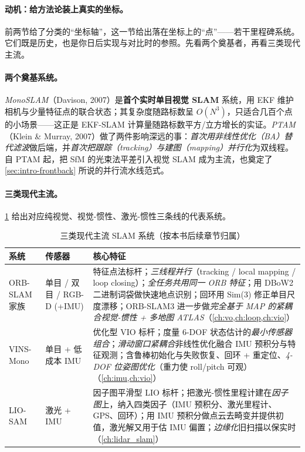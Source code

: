 \paragraph{动机：给方法论装上真实的坐标。}
前两节给了分类的“坐标轴”，这一节给出落在坐标上的“点”——若干里程碑系统。它们既是历史，也是你日后实现与对比时的参照。先看两个奠基者，再看三类现代主流。

\paragraph{两个奠基系统。}
\emph{MonoSLAM}（Davison, 2007）是\textbf{首个实时单目视觉 SLAM} 系统，用 EKF 维护相机与少量特征点的联合状态；其复杂度随路标数呈 $O(N^3)$，只适合几百个点的小场景——这正是 EKF-SLAM 计算量随路标数平方/立方增长的实证。\emph{PTAM}（Klein \& Murray, 2007）做了两件影响深远的事：\emph{首次用非线性优化（BA）替代滤波}做后端，并\emph{首次把跟踪（tracking）与建图（mapping）并行化}为双线程。自 PTAM 起，把 SfM 的光束法平差引入视觉 SLAM 成为主流，也奠定了 \cref{sec:intro-frontback} 所说的并行流水线范式。

\paragraph{三类现代主流。}
\cref{tab:intro-modern} 给出对应纯视觉、视觉-惯性、激光-惯性三条线的代表系统。

\begin{table}[H]\centering\small
\caption{三类现代主流 SLAM 系统（按本书后续章节归属）}
\label{tab:intro-modern}
\begin{tabular}{p{} p{} p{}}
\toprule
系统 & 传感器 & 核心特征 \\
\midrule
ORB-SLAM 家族\cite{murartal2015orbslam} & 单目 / 双目 / RGB-D (+IMU) & 特征点法标杆；\emph{三线程并行}（tracking / local mapping / loop closing）；\emph{全任务共用同一 ORB 特征}；用 DBoW2 二进制词袋做快速地点识别；回环用 Sim(3) 修正单目尺度漂移；ORB-SLAM3 进一步做\emph{完全基于 MAP 的紧耦合视觉-惯性 + 多地图 ATLAS}（\cref{ch:vo,ch:loop,ch:vio}） \\
VINS-Mono\cite{qin2018vins} & 单目 + 低成本 IMU & 优化型 VIO 标杆；度量 6-DOF 状态估计的\emph{最小传感器组合}；\emph{滑动窗口紧耦合}非线性优化融合 IMU 预积分与特征观测；含鲁棒初始化与失败恢复、回环 + 重定位、\emph{4-DOF 位姿图优化}（重力使 roll/pitch 可观）（\cref{ch:imu,ch:vio}） \\
LIO-SAM\cite{shan2020liosam} & 激光 + IMU & 因子图平滑型 LIO 标杆；把激光-惯性里程计建在\emph{因子图}上，纳入四类因子（IMU 预积分、激光里程计、GPS、回环）；用 IMU 预积分做点云去畸变并提供初值，激光解又用于估 IMU 偏置；\emph{边缘化}旧扫描以保实时（\cref{ch:lidar_slam}） \\
\bottomrule
\end{tabular}
\end{table}

